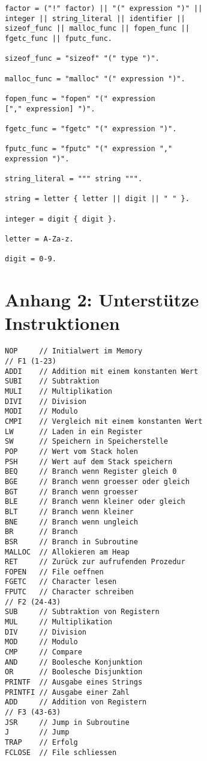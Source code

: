 \documentclass[a4paper,12pt]{article}
\begin{document}
\begin{lstlisting}
factor = ("!" factor) || "(" expression ")" || 
integer || string_literal || identifier || 
sizeof_func || malloc_func || fopen_func ||
fgetc_func || fputc_func.

sizeof_func = "sizeof" "(" type ")".

malloc_func = "malloc" "(" expression ")".

fopen_func = "fopen" "(" expression 
["," expression] ")".

fgetc_func = "fgetc" "(" expression ")".

fputc_func = "fputc" "(" expression ","
expression ")".

string_literal = """ string """.

string = letter { letter || digit || " " }.

integer = digit { digit }.

letter = A-Za-z.

digit = 0-9.
	\end{lstlisting}

	\newpage
	\section{Anhang 2: Unterstütze Instruktionen}
	\begin{lstlisting}
NOP 	// Initialwert im Memory
// F1 (1-23)
ADDI	// Addition mit einem konstanten Wert
SUBI	// Subtraktion
MULI	// Multiplikation
DIVI	// Division
MODI	// Modulo
CMPI	// Vergleich mit einem konstanten Wert
LW  	// Laden in ein Register
SW  	// Speichern in Speicherstelle
POP 	// Wert vom Stack holen
PSH 	// Wert auf dem Stack speichern
BEQ 	// Branch wenn Register gleich 0
BGE 	// Branch wenn groesser oder gleich
BGT 	// Branch wenn groesser
BLE 	// Branch wenn kleiner oder gleich
BLT 	// Branch wenn kleiner
BNE 	// Branch wenn ungleich
BR  	// Branch
BSR 	// Branch in Subroutine
MALLOC 	// Allokieren am Heap
RET 	// Zurück zur aufrufenden Prozedur
FOPEN 	// File oeffnen
FGETC 	// Character lesen
FPUTC 	// Character schreiben
// F2 (24-43)
SUB 	// Subtraktion von Registern
MUL 	// Multiplikation
DIV 	// Division
MOD 	// Modulo
CMP 	// Compare
AND 	// Boolesche Konjunktion
OR  	// Boolesche Disjunktion
PRINTF 	// Ausgabe eines Strings
PRINTFI // Ausgabe einer Zahl
ADD 	// Addition von Registern
// F3 (43-63)
JSR 	// Jump in Subroutine
J   	// Jump
TRAP 	// Erfolg
FCLOSE 	// File schliessen
	\end{lstlisting}
\end{document}
